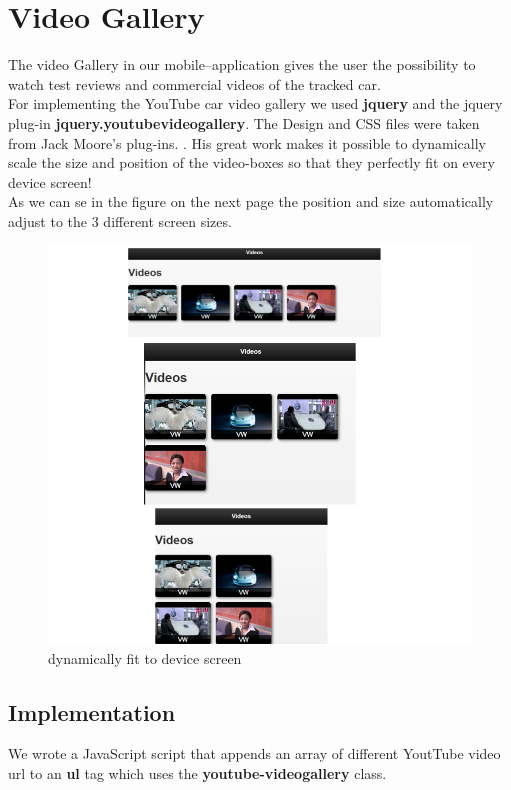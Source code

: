 \section{Video Gallery}
The video Gallery in our mobile--application gives the user the possibility to watch test reviews and commercial videos of the tracked car.
\\

   
For implementing the YouTube car video gallery we used \textbf{jquery} and the jquery plug-in \textbf{jquery.youtubevideogallery}. The Design and CSS files were taken from Jack Moore's plug-ins. \cite{jqueryVideo}. His great work makes it possible to dynamically scale the size and position of the video-boxes so that they perfectly fit on every device screen! 
\\
As we can se in the figure on the next page the position and size automatically adjust to the 3 different screen sizes.    
\\
\begin{figure}[H]
\centering
\includegraphics[width=\textwidth,height=\textheight,keepaspectratio]{graphics/dynamic.png}
\caption{dynamically fit to device screen}
\end{figure}  

\newpage
\subsection{Implementation}
We wrote a JavaScript script that appends an array of different YoutTube video url to an \textbf{ul} tag which uses the \textbf{youtube-videogallery} class.   

